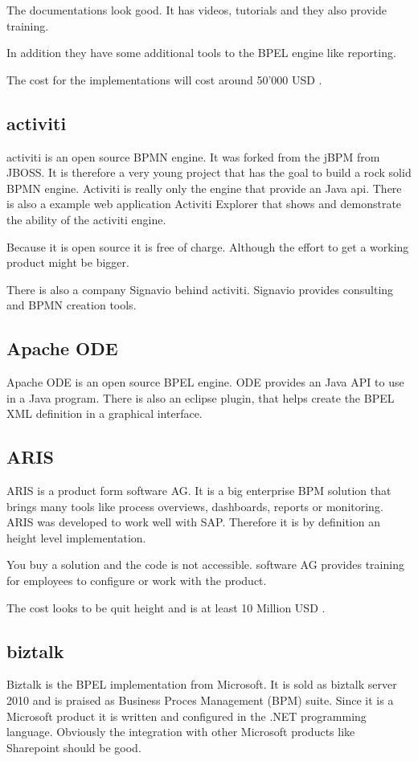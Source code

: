 \documentclass[paper=a4,twoside=false,BCOR=0mm,DIV=calc,fontsize=12pt]{scrartcl}
\begin{document}
The documentations look good. It has videos, tutorials and they also provide training. 

In addition they have some additional tools to the BPEL engine like reporting.

The cost for the implementations will cost around 50'000 USD \cite{activvosscost}.


\subsection{activiti}
activiti \cite{activiti} is an open source BPMN engine. It was forked from the jBPM \cite{jbpm} from JBOSS. It is therefore a very young project that has the goal to build a rock solid BPMN engine. Activiti is really only the engine that provide an Java api. There is also a example web application Activiti Explorer that shows and demonstrate the ability of the activiti engine.

Because it is open source it is free of charge. Although the effort to get a working product might be bigger. 

There is also a company Signavio \cite{signavio} behind activiti. Signavio provides consulting and BPMN creation tools.

\subsection{Apache ODE}
Apache ODE \cite{appacheODE} is an open source BPEL engine. ODE provides an Java API to use in a Java program.
There is also an eclipse plugin, that helps create the BPEL XML definition in a graphical interface.


\subsection{ARIS}
ARIS \cite{aris} is a product form software AG. It is a big enterprise BPM solution that brings many tools like process overviews, dashboards, reports or monitoring. ARIS was developed to work well with SAP. Therefore it is by definition an height level implementation.

You buy a solution and the code is not accessible. software AG provides training for employees to configure or work with the product. 

The cost looks to be quit height and is at least 10 Million USD \cite{ariscost}.


\subsection{biztalk}
Biztalk \cite{biztalk} is the BPEL implementation from Microsoft. It is sold as biztalk server 2010 and is praised as Business Proces Management (BPM) suite. Since it is a Microsoft product it is written and configured in the .NET programming language. Obviously the integration with other Microsoft products like Sharepoint should be good.
\end{document}

